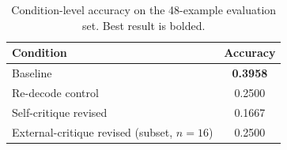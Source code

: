 \begin{table}[t]
\centering
\caption{Condition-level accuracy on the 48-example evaluation set. Best result is bolded.}
\label{tab:main-accuracy}
\begin{tabular}{@{}lc@{}}
\toprule
Condition & Accuracy \\
\midrule
Baseline & {\bf 0.3958} \\
Re-decode control & 0.2500 \\
Self-critique revised & 0.1667 \\
External-critique revised (subset, $n{=}16$) & 0.2500 \\
\bottomrule
\end{tabular}
\end{table}

